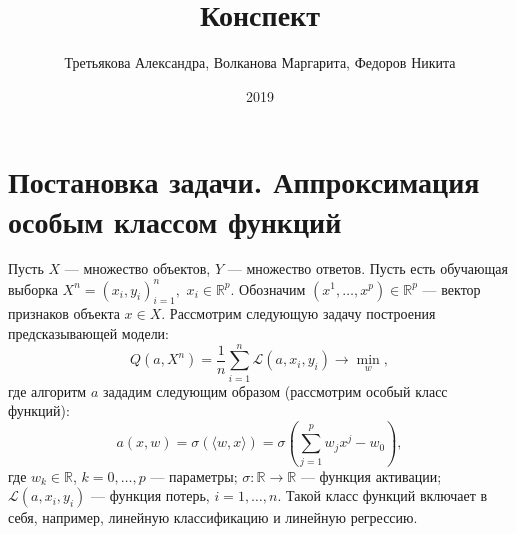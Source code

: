 \documentclass[specialist, 12pt, 
subf, %
href, colorlinks=true,
substylefile = spbu.rtx,
]{disser}
\begin{document}
 
	
	\lstset{ 
		basicstyle=\ttfamily\footnotesize, %
		numbers=left, %
		numberstyle=\footnotesize, %
		stepnumber=1, %
		numbersep=8pt, %
		language=R} 
	
	
	\title{Конспект} 
	
	
	\author{Третьякова Александра, Волканова Маргарита, Федоров Никита} 
	

	
	\date{2019}
	
	
	
	\maketitle
	
	
	\section{Постановка задачи. Аппроксимация особым классом функций}
	
	Пусть $X$ --- множество объектов, $Y$ --- множество ответов. Пусть есть обучающая выборка $X^n = (x_i, y_i)_{i=1}^{n},$ $x_i \in \mathbb{R}^p$. Обозначим $(x^1,\ldots,x^p)\in \mathbb{R}^p$ --- вектор признаков объекта $x\in X$. Рассмотрим следующую задачу построения предсказывающей модели:
	\begin{equation*}
	Q(a, X^n) = \frac{1}{n} \sum_{i=1}^{n} \mathcal{L}(a,x_i,y_i) \rightarrow \min_w,
	\end{equation*}
	где алгоритм $a$ зададим следующим образом (рассмотрим особый класс функций):
	\begin{equation*}
	a(x, w) = \sigma( \langle w,x \rangle ) = \sigma\left(\sum_{j=1}^{p} w_j x^j - w_0 \right),
	\end{equation*}
	где $w_k \in \mathbb{R}$, $k=0,\ldots,p$ --- параметры; 
	$\sigma: \mathbb{R} \rightarrow  \mathbb{R} $ --- функция активации;
	$\mathcal{L}(a,x_i,y_i)$ --- функция потерь, $i=1,\ldots,n$. Такой класс функций включает в себя, например, линейную классификацию и линейную регрессию.
	
\end{document}
